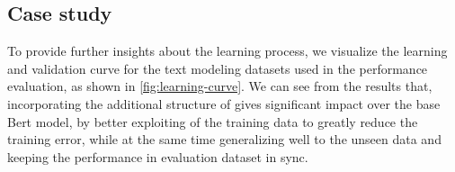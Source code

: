 \subsection{Case study}
To provide further insights about the learning process, we visualize the learning and validation curve for the text modeling datasets used in the performance evaluation, as shown in \autoref{fig:learning-curve}. We can see from the results that, incorporating the additional structure of \BertMWE gives significant impact over the base Bert model, by better exploiting of the training data to greatly reduce the training error, while at the same time generalizing well to the unseen data and keeping the performance in evaluation dataset in sync.
